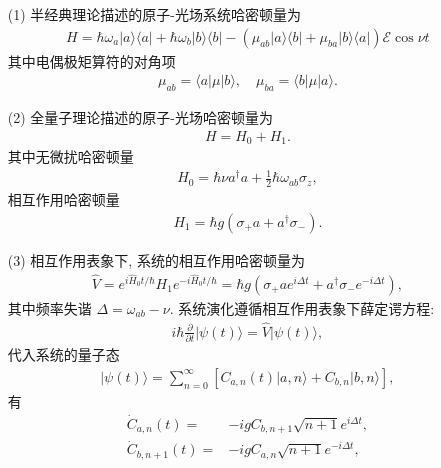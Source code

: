 \documentclass{assignment}
\begin{document}
\begin{sol}
    \begin{itemize}
        \item[(1)] 半经典理论描述的原子-光场系统哈密顿量为
        \begin{align}
            H=\hbar\omega_a\lvert a\rangle\langle a\rvert+\hbar\omega_b\lvert b\rangle\langle b\rvert-(\mu_{ab}\lvert a\rangle\langle b\rvert+\mu_{ba}\lvert b\rangle\langle a\rvert)\mathcal{E}\cos\nu t
        \end{align}
        其中电偶极矩算符的对角项
        \begin{align}
            \mu_{ab}=\langle a\rvert\mu\lvert b\rangle,\quad\mu_{ba}=\langle b\rvert\mu\lvert a\rangle.
        \end{align}
        \item[(2)] 全量子理论描述的原子-光场哈密顿量为
        \begin{align}
            H=H_0+H_1.
        \end{align}
        其中无微扰哈密顿量
        \begin{align}
            H_0=\hbar\nu a^{\dagger}a+\frac{1}{2}\hbar\omega_{ab}\sigma_z,
        \end{align}
        相互作用哈密顿量
        \begin{align}
            H_1=\hbar g(\sigma_+a+a^{\dagger}\sigma_-).
        \end{align}
        \item[(3)] 相互作用表象下, 系统的相互作用哈密顿量为
        \begin{align}
            \hat{V}=e^{i\hat{H}_0t/\hbar}H_1e^{-i\hat{H}_0t/\hbar}=\hbar g(\sigma_+ae^{i\Delta t}+a^{\dagger}\sigma_-e^{-i\Delta t}),
        \end{align}
        其中频率失谐 $\Delta=\omega_{ab}-\nu$.
        系统演化遵循相互作用表象下薛定谔方程:
        \begin{align}
            i\hbar\frac{\partial}{\partial t}\lvert\psi(t)\rangle=\hat{V}\lvert\psi(t)\rangle,
        \end{align}
        代入系统的量子态
        \begin{align}
            \lvert\psi(t)\rangle=\sum_{n=0}^{\infty}[C_{a,n}(t)\lvert a,n\rangle+C_{b,n}\lvert b,n\rangle],
        \end{align}
        有
        \begin{align}
            \dot{C}_{a,n}(t)=&-igC_{b,n+1}\sqrt{n+1}e^{i\Delta t},\\
            \dot{C}_{b,n+1}(t)=&-igC_{a,n}\sqrt{n+1}e^{-i\Delta t},

\end{align}
\end{itemize}
\end{sol}
\end{document}

